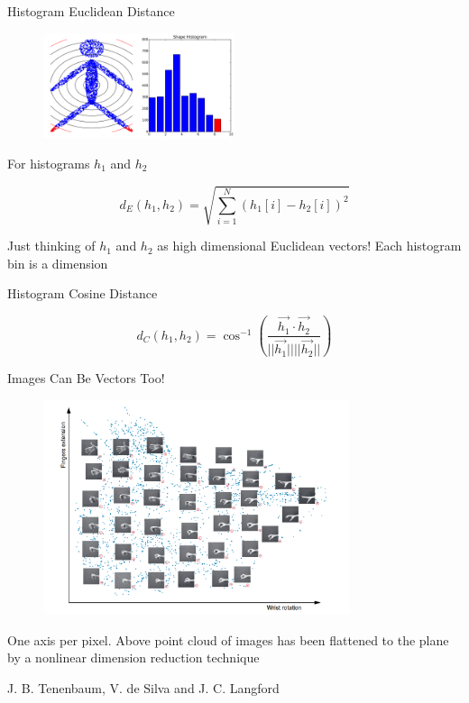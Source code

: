 \documentclass{beamer}
\begin{document}
\begin{frame}{Histogram Euclidean Distance}

\begin{figure}[t]
	\centering
    \includegraphics[width=0.5\textwidth]{ShapeHist9.pdf}
\end{figure}

For histograms $h_1$ and $h_2$

\[ d_E(h_1, h_2) = \sqrt{ \sum_{i=1}^N (h_1[i] - h_2[i])^2 } \]

Just thinking of $h_1$ and $h_2$ as high dimensional Euclidean vectors!  Each histogram bin is a dimension

\end{frame}

\begin{frame}{Histogram Cosine Distance}

\[ d_C(h_1, h_2) = \cos^{-1}\left(  \frac{ \vec{h_1} \cdot \vec{h_2} }{ ||\vec{h_1}|| ||\vec{h_2}|| } \right) \]

\end{frame}

\begin{frame}{Images Can Be Vectors Too!}

\begin{figure}[t]
	\centering
    \includegraphics[width=0.8\textwidth]{ISOMAP.png}
\end{figure}
\small One axis per pixel.  Above point cloud of images has been flattened to the plane by a nonlinear dimension reduction technique

\tiny J. B. Tenenbaum, V. de Silva and J. C. Langford 

\end{frame}
\end{document}
